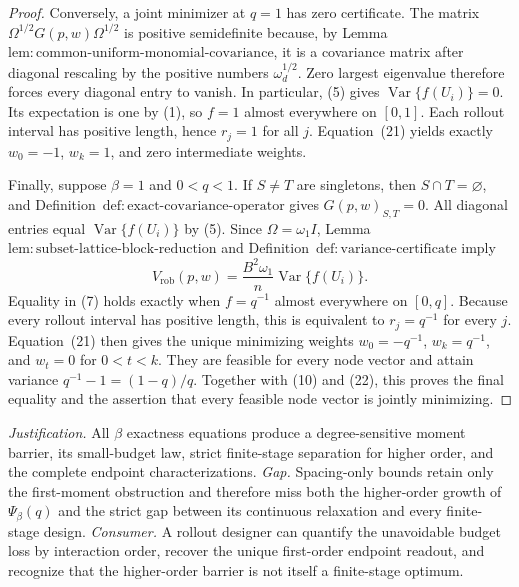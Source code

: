 \documentclass{article}
\begin{document}
\begin{proof}
Conversely, a joint minimizer at \(q=1\) has zero certificate.  The matrix \(\Omega^{1/2}G(p,w)\Omega^{1/2}\) is positive semidefinite because, by Lemma~\(\mathrm{lem{:}common\text{-}uniform\text{-}monomial\text{-}covariance}\), it is a covariance matrix after diagonal rescaling by the positive numbers \(\omega_d^{1/2}\).  Zero largest eigenvalue therefore forces every diagonal entry to vanish.  In particular, (5) gives \(\operatorname{Var}\{f(U_i)\}=0\).  Its expectation is one by (1), so \(f=1\) almost everywhere on \([0,1]\).  Each rollout interval has positive length, hence \(r_j=1\) for all \(j\).  Equation~(21) yields exactly \(w_0=-1\), \(w_k=1\), and zero intermediate weights.

Finally, suppose \(\beta=1\) and \(0<q<1\).  If \(S\ne T\) are singletons, then \(S\cap T=\varnothing\), and Definition~\(\mathrm{def{:}exact\text{-}covariance\text{-}operator}\) gives \(G(p,w)_{S,T}=0\).  All diagonal entries equal \(\operatorname{Var}\{f(U_i)\}\) by (5).  Since \(\Omega=\omega_1I\), Lemma~\(\mathrm{lem{:}subset\text{-}lattice\text{-}block\text{-}reduction}\) and Definition~\(\mathrm{def{:}variance\text{-}certificate}\) imply
\[
V_{\mathrm{rob}}(p,w)
=\frac{B^2\omega_1}{n}\operatorname{Var}\{f(U_i)\}.
\tag{22}
\]
Equality in (7) holds exactly when \(f=q^{-1}\) almost everywhere on \([0,q]\).  Because every rollout interval has positive length, this is equivalent to \(r_j=q^{-1}\) for every \(j\).  Equation~(21) then gives the unique minimizing weights \(w_0=-q^{-1}\), \(w_k=q^{-1}\), and \(w_t=0\) for \(0<t<k\).  They are feasible for every node vector and attain variance \(q^{-1}-1=(1-q)/q\).  Together with (10) and (22), this proves the final equality and the assertion that every feasible node vector is jointly minimizing.
\end{proof}
\par\smallskip\noindent \textit{Justification.} All \(\beta\) exactness equations produce a degree-sensitive moment barrier, its small-budget law, strict finite-stage separation for higher order, and the complete endpoint characterizations. \textit{Gap.} Spacing-only bounds retain only the first-moment obstruction and therefore miss both the higher-order growth of \(\Psi_\beta(q)\) and the strict gap between its continuous relaxation and every finite-stage design. \textit{Consumer.} A rollout designer can quantify the unavoidable budget loss by interaction order, recover the unique first-order endpoint readout, and recognize that the higher-order barrier is not itself a finite-stage optimum.
\end{document}
